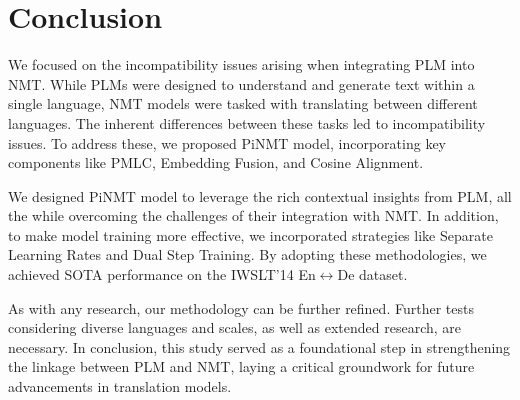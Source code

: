 \documentclass[conference]{IEEEtran}
\begin{document}
\section{Conclusion}
We focused on the incompatibility issues arising when integrating PLM into NMT. While PLMs were designed to understand and generate text within a single language, NMT models were tasked with translating between different languages. The inherent differences between these tasks led to incompatibility issues. To address these, we proposed PiNMT model, incorporating key components like PMLC, Embedding Fusion, and Cosine Alignment.

We designed PiNMT model to leverage the rich contextual insights from PLM, all the while overcoming the challenges of their integration with NMT. In addition, to make model training more effective, we incorporated strategies like Separate Learning Rates and Dual Step Training. By adopting these methodologies, we achieved SOTA performance on the IWSLT'14 En$\leftrightarrow$De dataset.

As with any research, our methodology can be further refined. Further tests considering diverse languages and scales, as well as extended research, are necessary. In conclusion, this study served as a foundational step in strengthening the linkage between PLM and NMT, laying a critical groundwork for future advancements in translation models.





\end{document}
